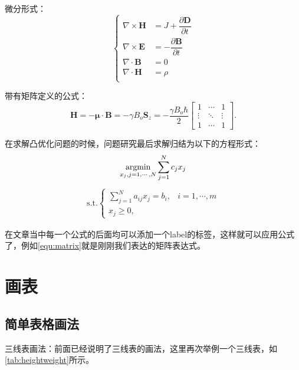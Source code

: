 微分形式：
\begin{equation}
    \begin{cases}
        \nabla\times\mathbf{H} & =J+\dfrac{\partial\mathbf{D}}{\partial{t}} \\
        \nabla\times\mathbf{E} & =-\dfrac{\partial\mathbf{B}}{\partial{t}}  \\
        \nabla\cdot\mathbf{B}  & =0                                         \\
        \nabla\cdot\mathbf{H}  & =\rho                                      \\
    \end{cases}
    \label{equ:diff-function}
\end{equation}

带有矩阵定义的公式：
\begin{equation}
    \mathbf{H} = -\mathbf\mu \cdot \mathbf{B} = -\gamma B_o \mathbf{S}_z = -\frac{\gamma B_o\hbar}{2}
    \begin{bmatrix}
        1      & \cdots & 1      \\
        \vdots & \ddots & \vdots \\
        1      & \cdots & 1
    \end{bmatrix}.
    \label{equ:matrix}
\end{equation}

在求解凸优化问题的时候，问题研究最后求解归结为以下的方程形式：
\begin{equation}
    \mathop{\mathrm{argmin}}\limits_{x_{j},j=1,\cdots,N}\sum\limits_{j=1}^{N}c_{j}x_{j}
\end{equation}
\begin{eqnarray}
    \text{s.t.}\begin{cases}
        \sum\limits_{j=1}^{N}a_{ij}x_{j}=b_{i}, & i=1,\cdots,{m} \\
        x_{j}\geq{0},
    \end{cases}
\end{eqnarray}

在文章当中每一个公式的后面均可以添加一个label的标签，这样就可以应用公式了，例如\cref{equ:matrix}就是刚刚我们表达的矩阵表达式。

\section{画表}
\subsection{简单表格画法}
三线表画法：前面已经说明了三线表的画法，这里再次举例一个三线表，如\autoref{tab:heightweight}所示。

